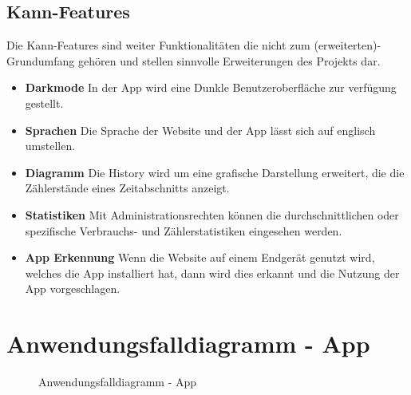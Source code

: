 \subsection{Kann-Features}
Die Kann-Features sind weiter Funktionalitäten die nicht zum (erweiterten)-Grundumfang gehören und stellen sinnvolle Erweiterungen des Projekts dar.
\begin{itemize}
\item  \textbf{Darkmode}
	In der App wird eine Dunkle Benutzeroberfläche zur verfügung gestellt.
\item \textbf{Sprachen}
	Die Sprache der Website und der App lässt sich auf englisch umstellen.
\item \textbf{Diagramm}
	Die History wird um eine grafische Darstellung erweitert, die die Zählerstände eines Zeitabschnitts anzeigt.
\item \textbf{Statistiken}
	Mit Administrationsrechten können die durchschnittlichen oder spezifische Verbrauchs- und Zählerstatistiken eingesehen werden.
\item \textbf{App Erkennung}
	Wenn die Website auf einem Endgerät genutzt wird, welches die App installiert hat, dann wird dies erkannt und
	die Nutzung der App vorgeschlagen.
\end{itemize}



\section{Anwendungsfalldiagramm - App}

\begin{figure}[h]
	\centering
	\caption{Anwendungsfalldiagramm - App}
	\label{fig:anwendungsfalldiagramm-app}
\end{figure}

\newpage

